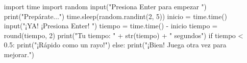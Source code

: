 \begin{center}
\begin{scratch}
\end{scratch}
\end{center}


\begin{typethis}
import time
import random
input("Presiona Enter para empezar ")
print("Prepárate...")
time.sleep(random.randint(2, 5))
inicio = time.time()
input("¡YA! ¡Presiona Enter! ")
tiempo = time.time() - inicio
tiempo = round(tiempo, 2)
print("Tu tiempo: " + str(tiempo) + " segundos")
if tiempo < 0.5:
    print("¡Rápido como un rayo!")
else:
    print("¡Bien! Juega otra vez para mejorar.")
\end{typethis}


